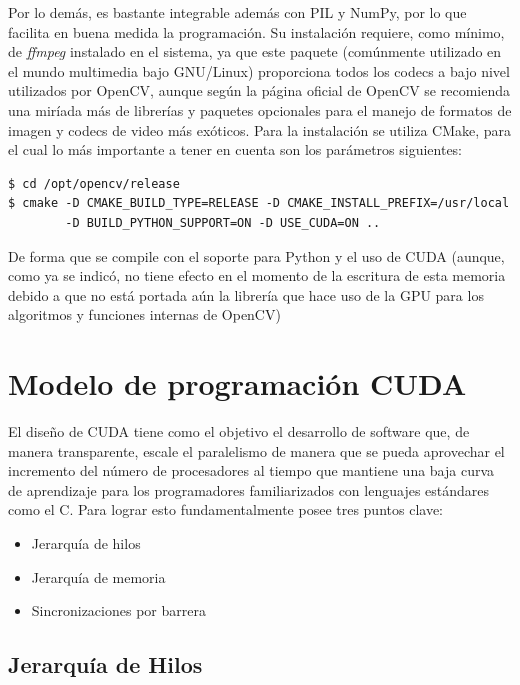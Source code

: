 \documentclass[twoside]{article}
\begin{document}
\vspace{5 mm}

Por lo demás, es bastante integrable además con PIL y NumPy, por lo que facilita en buena medida la programación. Su instalación requiere, como mínimo, de \emph{ffmpeg} instalado en el sistema, ya que este paquete (comúnmente utilizado en el mundo multimedia bajo GNU/Linux) proporciona todos los codecs a bajo nivel utilizados por OpenCV, aunque según la página oficial de OpenCV se recomienda una miríada más de librerías y paquetes opcionales para el manejo de formatos de imagen y codecs de video más exóticos. Para la instalación se utiliza CMake, para el cual lo más importante a tener en cuenta son los parámetros siguientes:

\begin{verbatim}
$ cd /opt/opencv/release
$ cmake -D CMAKE_BUILD_TYPE=RELEASE -D CMAKE_INSTALL_PREFIX=/usr/local
        -D BUILD_PYTHON_SUPPORT=ON -D USE_CUDA=ON ..
\end{verbatim}

De forma que se compile con el soporte para Python y el uso de CUDA (aunque, como ya se indicó, no tiene efecto en el momento de la escritura de esta memoria debido a que no está portada aún la librería que hace uso de la GPU para los algoritmos y funciones internas de OpenCV)


\section{Modelo de programación CUDA}

El diseño de CUDA tiene como el objetivo el desarrollo de software que, de manera transparente, escale el paralelismo de manera que se pueda aprovechar el incremento del número de procesadores al tiempo que mantiene una baja curva de aprendizaje para los programadores familiarizados con lenguajes estándares como el C. Para lograr esto fundamentalmente posee tres puntos clave:

\begin{itemize}
   \item Jerarquía de hilos
   \item Jerarquía de memoria
   \item Sincronizaciones por barrera
\end{itemize}

\subsection{Jerarquía de Hilos}
\end{document}
